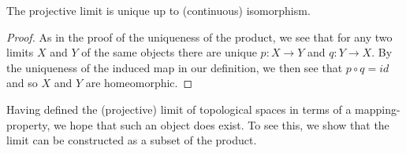       \begin{claim}
        The projective limit is unique up to (continuous) isomorphism.
        \begin{proof}
          As in the proof of the uniqueness of the product, we see that for any two limits $X$ and $Y$ of the same objects there are unique $p:X\rightarrow Y$ and $q:Y\rightarrow X$.
          By the uniqueness of the induced map in our definition, we then see that $p\circ q=id$ and so $X$ and $Y$ are homeomorphic.
        \end{proof}
      \end{claim}

      Having defined the (projective) limit of topological spaces in terms of a mapping-property, we hope that such an object does exist.
      To see this, we show that the limit can be constructed as a subset of the product.

